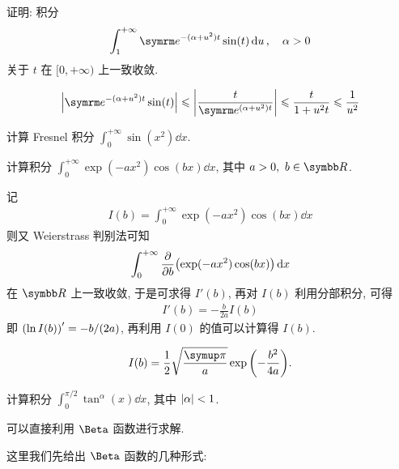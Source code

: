 \begin{exercise}[series=exer]
\begin{hint}
    \end{hint}
    \item 证明: 积分 
    \begin{align*}
        \int_{1}^{+\infty} \me^{-(\alpha + u^{2})t} \sin(t) \dd{u},\quad \alpha > 0
    \end{align*}
    关于 $ t $ 在 $ [0, +\infty) $ 上一致收敛.
    \begin{hint}
        \begin{align*}
            \abs{\me^{-(\alpha + u^{2})t} \sin(t)} \le \abs{\frac{t}{\me^{(\alpha + u^{2})t}}} \le \frac{t}{1 + u^{2}t} \le \frac{1}{u^{2}}
        \end{align*}
    \end{hint}
    \hitem 计算 Fresnel 积分 $ \int_{0}^{+\infty} \sin(x^{2}) \dd{x} $.
    \item 计算积分 $ \int_{0}^{+\infty} \exp(-a x^{2})\cos(bx) \dd{x} $, 其中 $ a > 0,\ b\in \R $.
    \begin{hint}
        记
        \begin{align*}
            I(b) = \int_{0}^{+\infty} \exp(-a x^{2})\cos(bx) \dd{x}
        \end{align*}
        则又 Weierstrass 判别法可知
        \begin{align*}
            \int_{0}^{+\infty} \pdv{b}\qty(\exp(-a x^{2})\cos(bx)) \dd{x}
        \end{align*}
        在 $ \R $ 上一致收敛, 于是可求得 $ I'(b) $, 再对 $ I(b) $ 利用分部积分, 可得
        \begin{align*}
            I'(b) = -\frac{b}{2a}I(b)
        \end{align*}
        即 $ \qty(\ln I(b))' = -b/(2a) $, 再利用 $ I(0) $ 的值可以计算得 $ I(b) $. 
    \end{hint}
    \begin{answer}
        \begin{align*}
            I(b) = \frac{1}{2}\sqrt{\frac{\pi}{a}}\exp\qty(-\frac{b^{2}}{4a}).
        \end{align*}
    \end{answer}
    \item 计算积分 $ \int_{0}^{\pi/2} \tan^{\alpha}(x) \dd{x} $, 其中 $ \abs{\alpha} < 1 $. 
    \begin{hint}
        可以直接利用 $ \Beta $ 函数进行求解.  
    \end{hint}
    \begin{answer}
        这里我们先给出 $ \Beta $ 函数的几种形式:
        \begin{align*}

\end{align*}
\end{answer}
\end{exercise}
